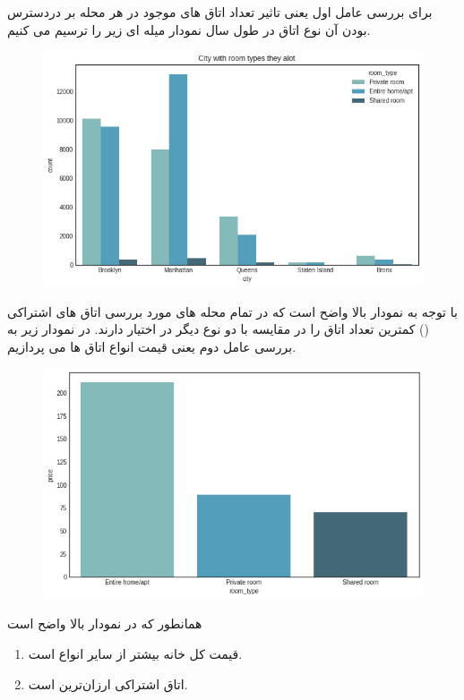 \documentclass[table]{article}
\begin{document}
	برای بررسی عامل اول یعنی تاثیر تعداد اتاق های موجود در هر محله بر دردسترس بودن آن نوع اتاق در طول سال نمودار میله ای زیر را ترسیم می کنیم.
	\begin{figure}[h!]
		\centering
		\includegraphics[scale=.5]{./graph6.png}
		\caption{}
	\end{figure}

با توجه به نمودار بالا واضح است که در تمام محله های مورد بررسی اتاق های اشتراکی () کمترین تعداد اتاق را در مقایسه با دو نوع دیگر در اختیار دارند. در نمودار زیر به بررسی عامل دوم یعنی قیمت انواع اتاق ها می پردازیم.

	\begin{figure}[h!]
		\centering
		\includegraphics[scale=.5]{./graph7.png}
		\caption{}
	\end{figure}
\newpage

	همانطور که در نمودار بالا واضح است
	\begin{enumerate}
		\item 
		قیمت کل خانه بیشتر از سایر انواع است.
		\item 
		اتاق اشتراکی ارزان‌ترین است.
	\end{enumerate}
\end{document}
